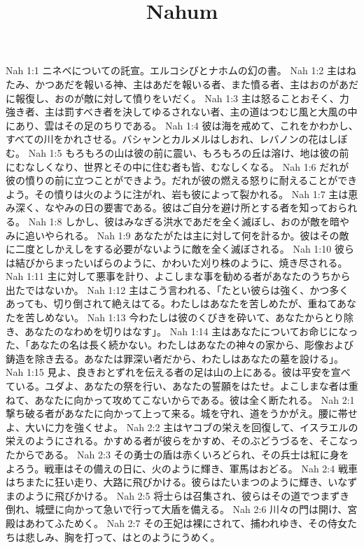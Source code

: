 

\title{Nahum}

Nah 1:1  ニネベについての託宣。エルコシびとナホムの幻の書。
Nah 1:2  主はねたみ、かつあだを報いる神、主はあだを報いる者、また憤る者、主はおのがあだに報復し、おのが敵に対して憤りをいだく。
Nah 1:3  主は怒ることおそく、力強き者、主は罰すべき者を決してゆるされない者、主の道はつむじ風と大風の中にあり、雲はその足のちりである。
Nah 1:4  彼は海を戒めて、これをかわかし、すべての川をかれさせる。バシャンとカルメルはしおれ、レバノンの花はしぼむ。
Nah 1:5  もろもろの山は彼の前に震い、もろもろの丘は溶け、地は彼の前にむなしくなり、世界とその中に住む者も皆、むなしくなる。
Nah 1:6  だれが彼の憤りの前に立つことができよう。だれが彼の燃える怒りに耐えることができよう。その憤りは火のように注がれ、岩も彼によって裂かれる。
Nah 1:7  主は恵み深く、なやみの日の要害である。彼はご自分を避け所とする者を知っておられる。
Nah 1:8  しかし、彼はみなぎる洪水であだを全く滅ぼし、おのが敵を暗やみに追いやられる。
Nah 1:9  あなたがたは主に対して何を計るか。彼はその敵に二度としかえしをする必要がないように敵を全く滅ぼされる。
Nah 1:10  彼らは結びからまったいばらのように、かわいた刈り株のように、焼き尽される。
Nah 1:11  主に対して悪事を計り、よこしまな事を勧める者があなたのうちから出たではないか。
Nah 1:12  主はこう言われる、「たとい彼らは強く、かつ多くあっても、切り倒されて絶えはてる。わたしはあなたを苦しめたが、重ねてあなたを苦しめない。
Nah 1:13  今わたしは彼のくびきを砕いて、あなたからとり除き、あなたのなわめを切りはなす」。
Nah 1:14  主はあなたについてお命じになった、「あなたの名は長く続かない。わたしはあなたの神々の家から、彫像および鋳造を除き去る。あなたは罪深い者だから、わたしはあなたの墓を設ける」。
Nah 1:15  見よ、良きおとずれを伝える者の足は山の上にある。彼は平安を宣べている。ユダよ、あなたの祭を行い、あなたの誓願をはたせ。よこしまな者は重ねて、あなたに向かって攻めてこないからである。彼は全く断たれる。
Nah 2:1  撃ち破る者があなたに向かって上って来る。城を守れ、道をうかがえ。腰に帯せよ、大いに力を強くせよ。
Nah 2:2  主はヤコブの栄えを回復して、イスラエルの栄えのようにされる。かすめる者が彼らをかすめ、そのぶどうづるを、そこなったからである。
Nah 2:3  その勇士の盾は赤くいろどられ、その兵士は紅に身をよろう。戦車はその備えの日に、火のように輝き、軍馬はおどる。
Nah 2:4  戦車はちまたに狂い走り、大路に飛びかける。彼らはたいまつのように輝き、いなずまのように飛びかける。
Nah 2:5  将士らは召集され、彼らはその道でつまずき倒れ、城壁に向かって急いで行って大盾を備える。
Nah 2:6  川々の門は開け、宮殿はあわてふためく。
Nah 2:7  その王妃は裸にされて、捕われゆき、その侍女たちは悲しみ、胸を打って、はとのようにうめく。
